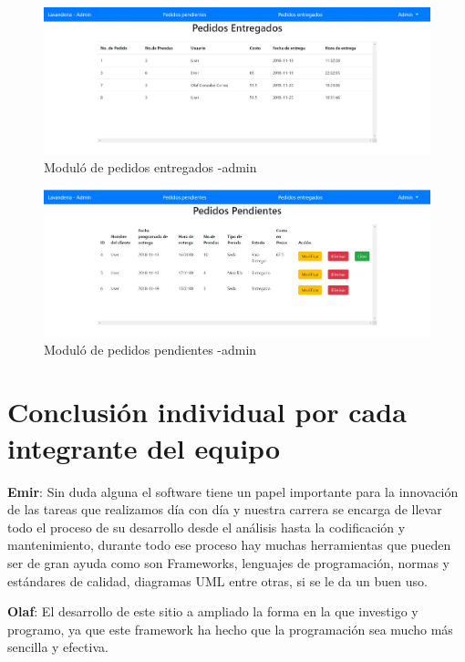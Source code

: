 \newpage




\begin{figure}[htb]
\begin{center}
\includegraphics[width=12cm]{./imagenes/pedidosentregadosadmin.jpg}
\end{center}
\caption{Moduló de pedidos entregados -admin}
\end{figure}


\begin{figure}[htb]
\begin{center}
\includegraphics[width=12cm]{./imagenes/pedidospendientesadmin.jpg}
\end{center}
\caption{Moduló de pedidos pendientes -admin}
\end{figure}


\section{Conclusión individual por cada integrante del equipo}
\textbf{Emir}: Sin duda alguna el software tiene un papel importante para la innovación de las tareas que realizamos día con día y nuestra carrera se encarga de llevar todo el proceso de su desarrollo desde el análisis hasta la codificación y mantenimiento, durante todo ese proceso hay muchas herramientas que pueden ser de gran ayuda como son Frameworks, lenguajes de programación, normas y estándares de calidad, diagramas UML entre otras, si se le da un buen uso.

\textbf{Olaf}: El desarrollo de este sitio a ampliado la forma en la que investigo y programo, ya que este framework ha hecho que la programación sea mucho más sencilla y efectiva.

